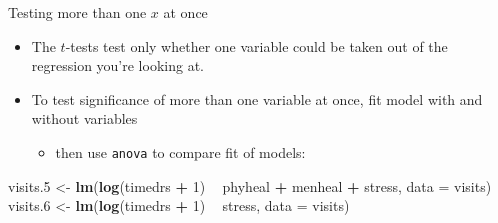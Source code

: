 \documentclass[ignorenonframetext,]{beamer}
\newenvironment{Shaded}{\begin{snugshade}}{\end{snugshade}}
\newcommand{\DataTypeTok}[1]{\textcolor[rgb]{0.13,0.29,0.53}{#1}}
\newcommand{\DecValTok}[1]{\textcolor[rgb]{0.00,0.00,0.81}{#1}}
\newcommand{\FloatTok}[1]{\textcolor[rgb]{0.00,0.00,0.81}{#1}}
\newcommand{\KeywordTok}[1]{\textcolor[rgb]{0.13,0.29,0.53}{\textbf{#1}}}
\newcommand{\NormalTok}[1]{#1}
\newcommand{\OperatorTok}[1]{\textcolor[rgb]{0.81,0.36,0.00}{\textbf{#1}}}
\newcommand{\StringTok}[1]{\textcolor[rgb]{0.31,0.60,0.02}{#1}}
\providecommand{\tightlist}{%
  \setlength{\itemsep}{0pt}\setlength{\parskip}{0pt}}
\begin{document}
\begin{frame}[fragile]{Testing more than one \(x\) at once}
\protect\hypertarget{testing-more-than-one-x-at-once}{}

\begin{itemize}
\tightlist
\item
  The \(t\)-tests test only whether one variable could be taken out of
  the regression you're looking at.
\item
  To test significance of more than one variable at once, fit model with
  and without variables

  \begin{itemize}
  \tightlist
  \item
    then use \texttt{anova} to compare fit of models:
  \end{itemize}
\end{itemize}

\begin{Shaded}
\begin{Highlighting}[]
\NormalTok{visits}\FloatTok{.5}\NormalTok{ <-}\StringTok{ }\KeywordTok{lm}\NormalTok{(}\KeywordTok{log}\NormalTok{(timedrs }\OperatorTok{+}\StringTok{ }\DecValTok{1}\NormalTok{) }\OperatorTok{~}\StringTok{ }\NormalTok{phyheal }\OperatorTok{+}\StringTok{ }\NormalTok{menheal }\OperatorTok{+}\StringTok{ }\NormalTok{stress, }
               \DataTypeTok{data =}\NormalTok{ visits)}
\NormalTok{visits}\FloatTok{.6}\NormalTok{ <-}\StringTok{ }\KeywordTok{lm}\NormalTok{(}\KeywordTok{log}\NormalTok{(timedrs }\OperatorTok{+}\StringTok{ }\DecValTok{1}\NormalTok{) }\OperatorTok{~}\StringTok{ }\NormalTok{stress, }\DataTypeTok{data =}\NormalTok{ visits)}
\end{Highlighting}
\end{Shaded}

\end{frame}
\end{document}
